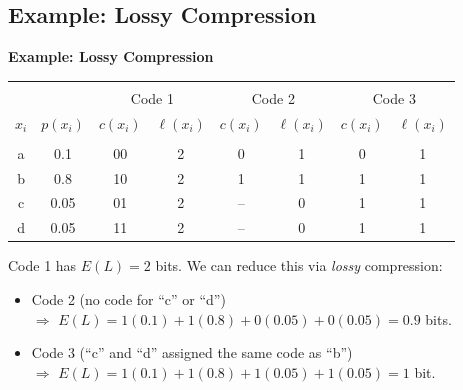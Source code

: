 \documentclass[compress]{beamer}        %
\makeatletter
\newcommand{\tcb}{\textcolor{beamer@blendedblue}}
\makeatother
\begin{document}
\subsection{Example: Lossy Compression}
\begin{frame}{\bf \tcb{Example: Lossy Compression\\[-0.9cm]}}
\begin{center}
\begin{tabular}{|cc|cc|cc|cc|}
\hline
&&&&&&&\\[-0.4cm]
&& \multicolumn{2}{c|}{Code 1} & \multicolumn{2}{c|}{Code 2} & \multicolumn{2}{|c|}{Code 3} \\[0.1cm]
$x_i$ & $p(x_i)$ & $c(x_i)$ & $\ell(x_i)$ & $c(x_i)$ & $\ell(x_i)$  & $c(x_i)$ & $\ell(x_i)$ \\[0.1cm]
\hline
&&&&&&&\\[-0.4cm]
a     & 0.1     &  00  &  2  &  0   &  1  &  0   &  1  \\[0.1cm]
b     & 0.8     &  10  &  2  &  1   &  1  &  1   &  1  \\[0.1cm]
c     & 0.05    &  01  &  2  &  --  &  0  &  1   &  1  \\[0.1cm]
d     & 0.05    &  11  &  2  &  --  &  0  &  1   &  1  \\[0.1cm]
\hline
\end{tabular}
\end{center}
Code 1 has $E(L) = 2$ bits. We can reduce this via \emph{lossy} compression:\\[0.2cm]
\begin{itemize}\itemsep0.5cm
\item Code 2 (no code for ``c'' or ``d'') \\[0.2cm]
$\Rightarrow$ $E(L) = 1(0.1)+1(0.8)+0(0.05)+0(0.05) = 0.9$ bits.
\item Code 3 (``c'' and ``d'' assigned the same code as ``b'') \\[0.2cm] $\Rightarrow$ $E(L) = 1(0.1)+1(0.8)+1(0.05)+1(0.05) = 1$ bit.
\end{itemize}

\end{frame}
\end{document}

